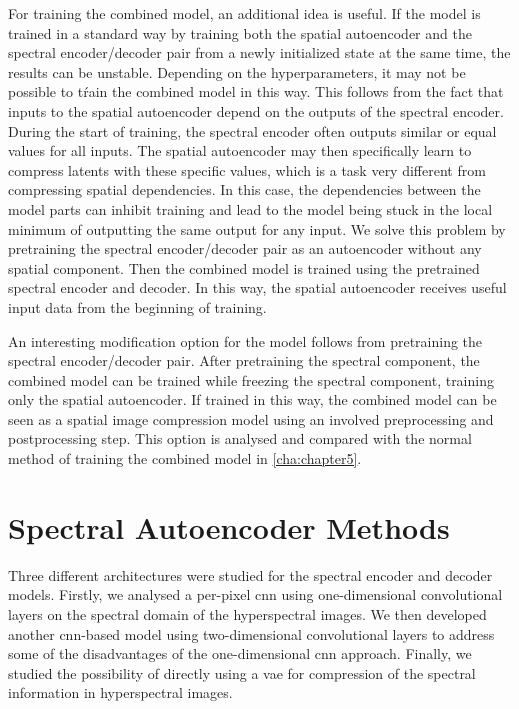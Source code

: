 For training the combined model, an additional idea is useful. If the model is trained in a standard way by training both the spatial autoencoder and the spectral encoder/decoder pair from a newly initialized state at the same time, the results can be unstable. Depending on the hyperparameters, it may not be possible to tŕain the combined model in this way. This follows from the fact that inputs to the spatial autoencoder depend on the outputs of the spectral encoder. During the start of training, the spectral encoder often outputs similar or equal values for all inputs. The spatial autoencoder may then specifically learn to compress latents with these specific values, which is a task very different from compressing spatial dependencies. In this case, the dependencies between the model parts can inhibit training and lead to the model being stuck in the local minimum of outputting the same output for any input. We solve this problem by pretraining the spectral encoder/decoder pair as an autoencoder without any spatial component. Then the combined model is trained using the pretrained spectral encoder and decoder. In this way, the spatial autoencoder receives useful input data from the beginning of training. 

An interesting modification option for the model follows from pretraining the spectral encoder/decoder pair. After pretraining the spectral component, the combined model can be trained while freezing the spectral component, training only the spatial autoencoder. If trained in this way, the combined model can be seen as a spatial image compression model using an involved preprocessing and postprocessing step. This option is analysed and compared with the normal method of training the combined model in \autoref{cha:chapter5}.
\section{Spectral Autoencoder Methods}
Three different architectures were studied for the spectral encoder and decoder models. Firstly, we analysed a per-pixel \ac{cnn} using one-dimensional convolutional layers on the spectral domain of the hyperspectral images. We then developed another \ac{cnn}-based model using two-dimensional convolutional layers to address some of the disadvantages of the one-dimensional \ac{cnn} approach. Finally, we studied the possibility of directly using a \ac{vae} for compression of the spectral information in hyperspectral images. 
